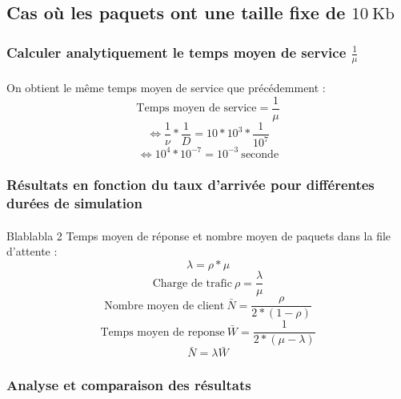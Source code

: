         \subsection{Cas où les paquets ont une taille fixe de $10 \ \text{Kb}$}
%
            \subsubsection{Calculer analytiquement le temps moyen de service $\frac{1}{\mu}$}
%
                \paragraph{}
On obtient le même temps moyen de service que précédemment :
%
                \[  \text{Temps moyen de service} = \frac{1}{\mu} \]
                \[ \iff \frac{1}{\nu} * \frac{1}{D} = 10 * 10^{3} * \frac{1}{10^{7}} \]
                \[ \iff 10^{4} * 10^{-7} = 10^{-3} \ \text{seconde} \]
%
%
            \subsubsection{Résultats en fonction du taux d'arrivée pour différentes durées de simulation}
%
                \paragraph{}
Blablabla 2
Temps moyen de réponse et nombre moyen de paquets dans la file d'attente :
%
            \[  \lambda = \rho * \mu \]
            \[  \text{Charge de trafic} \ \rho = \frac{\lambda}{\mu} \]
            \[  \text{Nombre moyen de client} \ \bar{N} = \frac{\rho}{2 * (1 - \rho)} \]
            \[  \text{Temps moyen de reponse} \ \bar{W} = \frac{1}{2 * (\mu - \lambda)} \]
            \[  \bar{N} = \lambda \bar{W} \]
%
%
            \subsubsection{Analyse et comparaison des résultats}
%
